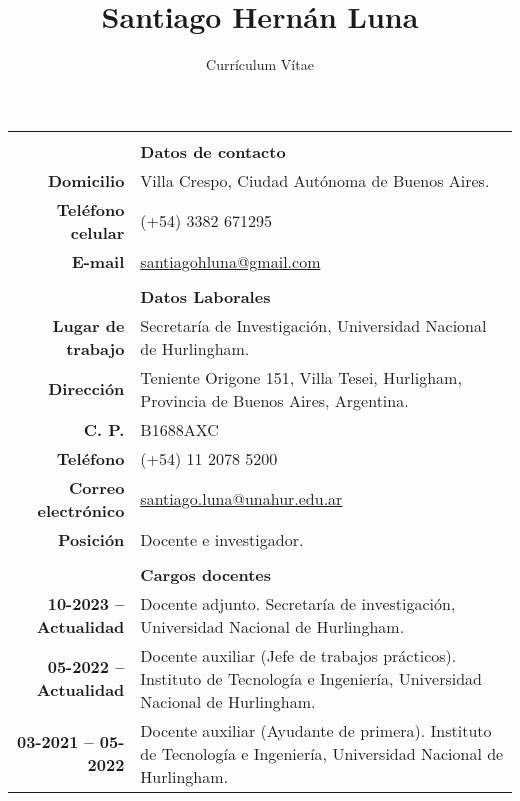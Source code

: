 \documentclass[12pt,a4paper]{article}
\title{Santiago Hernán Luna}
\author{Currículum Vítae}
\date{ }
\begin{document}
\maketitle

\begin{longtable}[t]{r p{12cm}}


        & \\
        & \textbf{Datos de contacto} \\
 \cline{2-2}
 \textbf{Domicilio}                   & Villa Crespo, Ciudad Autónoma de Buenos Aires. \\
 \textbf{Teléfono celular}            & (+54) 3382 671295 \\
 \textbf{E-mail} & \href{mailto:santiagohluna@gmail.com}{santiagohluna@gmail.com} \\

 & \\
 & \textbf{Datos Laborales} \\
\cline{2-2}
\textbf{Lugar de trabajo}   & Secretaría de Investigación, Universidad Nacional de Hurlingham. \\
\textbf{Dirección}          & Teniente Origone 151, Villa Tesei, Hurligham, Provincia de Buenos Aires, Argentina. \\
\textbf{C. P.}              & B1688AXC \\     
\textbf{Teléfono}           & (+54) 11 2078 5200 \\
\textbf{Correo electrónico} & \href{mailto:santiago.luna@unahur.edu.ar}{santiago.luna@unahur.edu.ar} \\
\textbf{Posición}           & Docente e investigador. \\

& \\
& \textbf{Cargos docentes} \\
\cline{2-2}
\textbf{10-2023 -- Actualidad} & Docente adjunto. Secretaría de investigación, Universidad Nacional de Hurlingham. \\
\textbf{05-2022 -- Actualidad} & Docente auxiliar (Jefe de trabajos prácticos). Instituto de Tecnología e Ingeniería, Universidad Nacional de Hurlingham. \\
\textbf{03-2021 -- 05-2022} & Docente auxiliar (Ayudante de primera). Instituto de Tecnología e Ingeniería, Universidad Nacional de Hurlingham. \\


\end{longtable}
\end{document}
